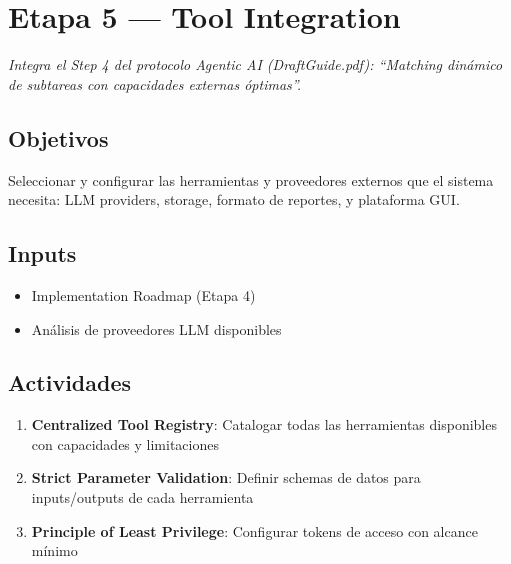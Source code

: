 \documentclass[12pt,a4paper]{article}
\begin{document}
\section{Etapa 5 --- Tool Integration}

\emph{Integra el Step 4 del protocolo Agentic AI (DraftGuide.pdf): ``Matching dinámico de subtareas con capacidades externas óptimas''.}

\subsection*{Objetivos}
Seleccionar y configurar las herramientas y proveedores externos que el sistema necesita: LLM providers, storage, formato de reportes, y plataforma GUI.

\subsection*{Inputs}
\begin{itemize}
  \item Implementation Roadmap (Etapa 4)
  \item Análisis de proveedores LLM disponibles
\end{itemize}

\subsection*{Actividades}
\begin{enumerate}
  \item \textbf{Centralized Tool Registry}: Catalogar todas las herramientas disponibles con capacidades y limitaciones
  \item \textbf{Strict Parameter Validation}: Definir schemas de datos para inputs/outputs de cada herramienta
  \item \textbf{Principle of Least Privilege}: Configurar tokens de acceso con alcance mínimo
\end{enumerate}
\end{document}
